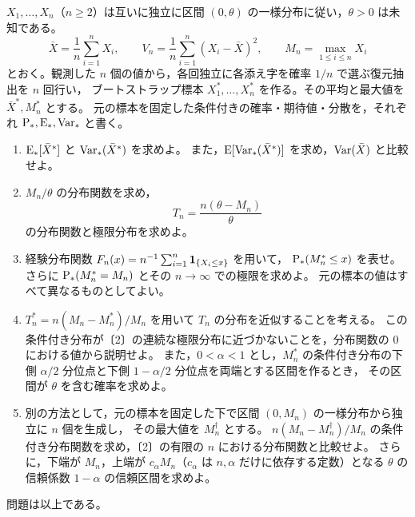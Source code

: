 \documentclass[a4paper,11pt]{ltjsarticle}
\begin{document}
$X_1,\ldots,X_n$（$n\geq2$）は互いに独立に区間 $(0,\theta)$ の一様分布に従い，$\theta>0$ は未知である。
\[
\bar X=\frac1n\sum_{i=1}^nX_i,\qquad
V_n=\frac1n\sum_{i=1}^n(X_i-\bar X)^2,\qquad
M_n=\max_{1\leq i\leq n}X_i
\]
とおく。観測した $n$ 個の値から，各回独立に各添え字を確率 $1/n$ で選ぶ復元抽出を $n$ 回行い，
ブートストラップ標本 $X_1^*,\ldots,X_n^*$ を作る。その平均と最大値を $\bar X^*,M_n^*$ とする。
元の標本を固定した条件付きの確率・期待値・分散を，それぞれ $\operatorname{P}_*,\operatorname{E}_*,\operatorname{Var}_*$ と書く。
\begin{enumerate}
\item $\operatorname{E}_*[\bar X^*]$ と $\operatorname{Var}_*(\bar X^*)$ を求めよ。
また，$\operatorname{E}[\operatorname{Var}_*(\bar X^*)]$ を求め，$\operatorname{Var}(\bar X)$ と比較せよ。
\item $M_n/\theta$ の分布関数を求め，
\[
T_n=\frac{n(\theta-M_n)}{\theta}
\]
の分布関数と極限分布を求めよ。
\item 経験分布関数 $F_n(x)=n^{-1}\sum_{i=1}^n\mathbf{1}_{\{X_i\leq x\}}$ を用いて，
$\operatorname{P}_*(M_n^*\leq x)$ を表せ。さらに $\operatorname{P}_*(M_n^*=M_n)$ とその $n\to\infty$ での極限を求めよ。
元の標本の値はすべて異なるものとしてよい。
\item $T_n^*=n(M_n-M_n^*)/M_n$ を用いて $T_n$ の分布を近似することを考える。
この条件付き分布が〔2〕の連続な極限分布に近づかないことを，分布関数の $0$ における値から説明せよ。
また，$0<\alpha<1$ とし，$M_n^*$ の条件付き分布の下側 $\alpha/2$ 分位点と下側 $1-\alpha/2$ 分位点を両端とする区間を作るとき，
その区間が $\theta$ を含む確率を求めよ。
\item 別の方法として，元の標本を固定した下で区間 $(0,M_n)$ の一様分布から独立に $n$ 個を生成し，
その最大値を $M_n^\dagger$ とする。
$n(M_n-M_n^\dagger)/M_n$ の条件付き分布関数を求め，〔2〕の有限の $n$ における分布関数と比較せよ。
さらに，下端が $M_n$，上端が $c_\alpha M_n$（$c_\alpha$ は $n,\alpha$ だけに依存する定数）となる
$\theta$ の信頼係数 $1-\alpha$ の信頼区間を求めよ。
\end{enumerate}
\vfill\begin{center}問題は以上である。\end{center}
\end{document}
